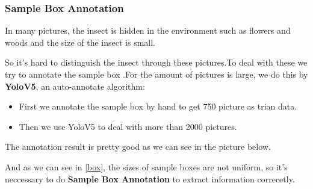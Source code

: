 \documentclass[12pt]{article}
\begin{document}
\subsubsection{Sample Box Annotation}
In many pictures, the insect is hidden in the environment such as flowers and woods and the size of the insect is small.

So it's hard to distinguish the insect through these pictures.To deal with these we try to annotate the sample box .For the amount of pictures is large, we do this by  \textbf{YoloV5}\cite{Yolo}, an auto-annotate algorithm:
\begin{itemize}
	\item  First we annotate the sample box by hand to get 750 picture as trian data.
	\item  Then we use YoloV5 to deal with more than 2000 pictures.
\end{itemize}
The annotation result is pretty good as we can see in the picture below.

And as we can see in \ref{box}, the sizes of sample boxes are not uniform, so it's neccessary to do \textbf{Sample Box Annotation} to extract information correcetly.
\end{document}
